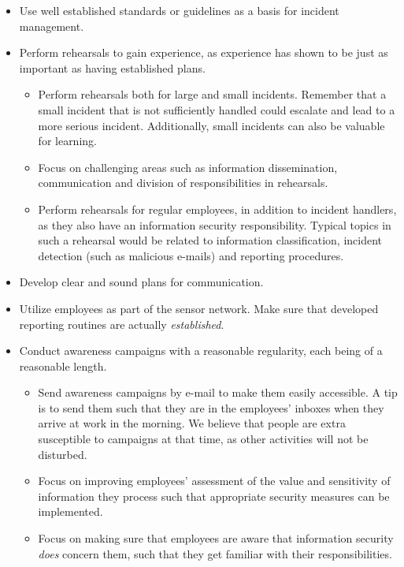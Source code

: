\begin{itemize}
\item Use well established standards or guidelines as a basis for incident management.
\item Perform rehearsals to gain experience, as experience has shown to be just as important as having established plans.
\begin{itemize}
\item Perform rehearsals both for large and small incidents. Remember that a small incident that is not sufficiently handled could escalate and lead to a more serious incident. Additionally, small incidents can also be valuable for learning.
\item Focus on challenging areas such as information dissemination, communication and division of responsibilities in rehearsals.
\item Perform rehearsals for regular employees, in addition to incident handlers, as they also have an information security responsibility. Typical topics in such a rehearsal would be related to information classification, incident detection (such as malicious e-mails) and reporting procedures. 
\end{itemize}
\item Develop clear and sound plans for communication.
\item Utilize employees as part of the sensor network. Make sure that developed reporting routines are actually \textit{established}.
\item Conduct awareness campaigns with a reasonable regularity, each being of a reasonable length. %
\begin{itemize}
\item Send awareness campaigns by e-mail to make them easily accessible. A tip is to send them such that they are in the employees' inboxes when they arrive at work in the morning. We believe that people are extra susceptible to campaigns at that time, as other activities will not be disturbed.
\item Focus on improving employees' assessment of the value and sensitivity of information they process such that appropriate security measures can be implemented. 
\item Focus on making sure that employees are aware that information security \textit{does} concern them, such that they get familiar with their responsibilities.

\end{itemize}
\end{itemize}
